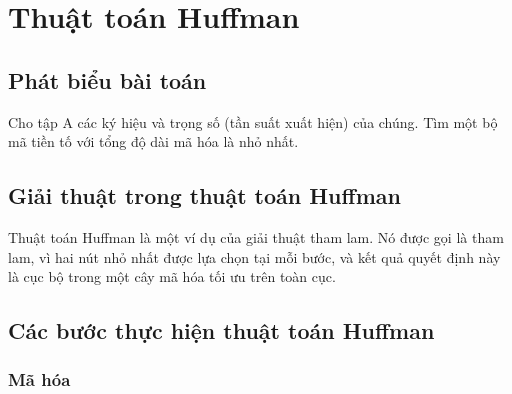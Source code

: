 \chapter{Thuật toán Huffman}

\section{Phát biểu bài toán} 

Cho tập A các ký hiệu và trọng số (tần suất xuất hiện) của chúng. Tìm một bộ mã tiền tố với tổng độ dài mã hóa là nhỏ nhất.

\section{Giải thuật trong thuật toán Huffman}

Thuật toán Huffman là một ví dụ của giải thuật tham lam. Nó được gọi là tham lam, vì hai nút nhỏ nhất được lựa chọn tại mỗi bước, và kết quả quyết định này là cục bộ trong một cây mã hóa tối ưu trên toàn cục.

\section{Các bước thực hiện thuật toán Huffman}

    \subsection{Mã hóa}

